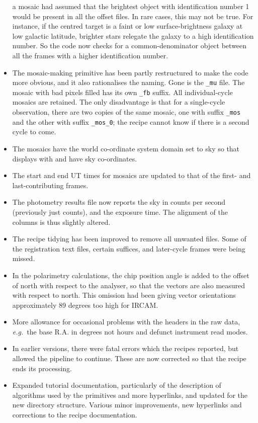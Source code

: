 \documentclass[twoside,11pt,nolof]{starlink}
\providecommand{\GAIA}{{\footnotesize GAIA}}
\providecommand{\KAPPA}{{\footnotesize KAPPA}}
\begin{document}
\begin{itemize}
         a mosaic had assumed that the brightest object with
         identification number 1 would be present in all the offset
	 files.  In rare cases, this may not be true.  For instance,
	 if the centred target is a faint or low surface-brightness
	 galaxy at low galactic latitude, brighter stars relegate the
	 galaxy to a high identification number.  So the code now
	 checks for a common-denominator object between all the frames
	 with a higher identification number.
   \item The mosaic-making primitive has been partly restructured to
         make the code more obvious, and it also rationalises the
         naming.  Gone is the {\tt\_mu} file.  The mosaic with bad
	 pixels filled has its own {\tt\_fb} suffix.  All
	 individual-cycle mosaics are retained.  The only disadvantage
	 is that for a single-cycle observation, there are two copies
	 of the same mosaic, one with suffix {\tt\_mos} and the other
	 with suffix {\tt\_mos\_0}; the recipe cannot know if there
         is a second cycle to come.
   \item The mosaics have the world co-ordinate system domain set to sky
         so that displays with \xref{\GAIA}{sun214}{} and
         \xref{\KAPPA}{sun95}{} have sky co-ordinates.
   \item The start and end UT times for mosaics are updated to that of
         the first- and last-contributing frames.
   \item The photometry results file now reports the sky in counts per
         second (previously just counts), and the exposure time.  The
         alignment of the columns is thus slightly altered.
   \item The recipe tidying has been improved to remove all unwanted
         files.  Some of the registration text files, certain suffices,
         and later-cycle frames were being missed.
   \item In the polarimetry calculations, the chip position angle is
         added to the offset of north with respect to the analyser,
         so that the vectors are also measured with respect to north.
         This omission had been giving vector orientations approximately
         89 degrees too high for IRCAM.
   \item More allowance for occasional problems with the headers in the
         raw data, \emph{e.g.}\ the base R.A. in degrees not hours and
         defunct instrument read modes.
   \item In earlier versions, there were fatal errors which the recipes
         reported, but allowed the pipeline to continue.  These are now
         corrected so that the recipe ends its processing.
   \item Expanded tutorial documentation, particularly of the description
         of algorithms used by the primitives and more hyperlinks, and
         updated for the new directory structure.  Various minor
         improvements, new hyperlinks and corrections to the recipe
         documentation.
\end{itemize}
\end{document}
